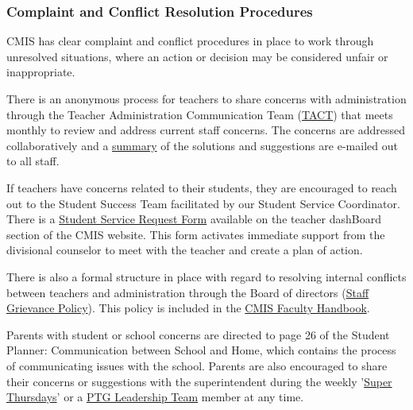 \subsubsection{Complaint and Conflict Resolution Procedures}



\begin{findings}
CMIS has clear complaint and conflict procedures in place to work through unresolved situations, where an action or decision may be considered unfair or inappropriate.  

There is an anonymous process for teachers to share concerns with administration through the Teacher Administration Communication Team (\href{https://docs.google.com/a/cmis.ac.th/document/d/14nhwcw8xo3i-23Q-WUxo6KJ_c8yFKu-jTdCctt4MFcs/edit?usp=sharing}{TACT}) that meets monthly to review and address current staff concerns. The concerns are addressed collaboratively and a \href{https://docs.google.com/a/cmis.ac.th/document/d/1KLB4c5_LkxXzq4vP2EuNhBVPp2q_FT9qy1cBBwaS5JM/edit?usp=sharing}{summary} of the solutions and suggestions are e-mailed out to all staff.

If teachers have concerns related to their students, they are encouraged to reach out to the Student Success Team facilitated by our Student Service Coordinator.  There is a \href{https://docs.google.com/a/cmis.ac.th/forms/d/e/1FAIpQLScVtFtaEXarGOjwsiJyGdbLAMbeNzG9m44i1fWXFLbtMKZcUg/viewform}{Student Service Request Form} available on the teacher dashBoard section of the CMIS website. This form activates immediate support from the divisional counselor to meet with the teacher and create a plan of action.

There is also a formal structure in place with regard to resolving internal conflicts between teachers and administration through the Board of directors (\href{https://docs.google.com/a/cmis.ac.th/document/d/1RRBuWgqIb-BlwD8vTRrTG0u_FCHgQFD_oEbvseNdAPc/edit?usp=sharing}{Staff Grievance Policy}). This policy is included in the \href{https://docs.google.com/document/d/1fNreQp5yTOg_g9K4UnR8xvyQf-GcFOHo-6Onp4SqlKg/edit}{CMIS Faculty Handbook}.

Parents with student or school concerns are directed to page 26 of the Student Planner: Communication between School and Home, which contains the process of communicating issues with the school.
Parents are also encouraged to share their concerns or suggestions with the superintendent during the weekly '\href{http://blogs.cmis.ac.th/newsletter/2016/09/05/super-thursdays-starts-this-week/}{Super Thursdays}' or a \href{http://blogs.cmis.ac.th/ptg/about/}{PTG Leadership Team} member at any time. 


\end{findings}

